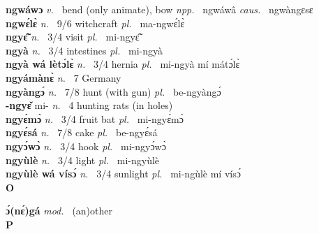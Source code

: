 {\bfseries ngwáwɔ}  {\itshape v.~} bend (only animate), bow   {\itshape npp.~} ngwáwâ {\itshape caus.~} ngwàngɛsɛ   \\ 
{\bfseries ngwɛ́lɛ̀}  {\itshape n.~} 9/6 witchcraft  {\itshape pl.~} ma-ngwɛ́lɛ̀  \\ 
{\bfseries ngyɛ̃̂}  {\itshape n.~} 3/4 visit {\itshape pl.~} mi-ngyɛ̃̂    \\ 
{\bfseries ngyà}  {\itshape n.~} 3/4 intestines {\itshape pl.~} mi-ngyà    \\ 
{\bfseries ngyà wá lètɔ́lɛ̀}  {\itshape n.~} 3/4 hernia {\itshape pl.~} mi-ngyà mí mátɔ́lɛ̀    \\ 
{\bfseries ngyámànɛ̀}  {\itshape n.~} 7 Germany    \\ 
{\bfseries ngyàngɔ́}  {\itshape n.~} 7/8 hunt (with gun) {\itshape pl.~} be-ngyàngɔ́    \\ 
{\bfseries -ngyɛ̌} mi- {\itshape n.~} 4 hunting rats (in holes)    \\ 
{\bfseries ngyɛ́mɔ̀}  {\itshape n.~} 3/4 fruit bat  {\itshape pl.~} mi-ngyɛ́mɔ̀    \\ 
{\bfseries ngyɛ́sá}  {\itshape n.~} 7/8 cake  {\itshape pl.~} be-ngyɛ́sá    \\ 
{\bfseries ngyɔ́wɔ̀}  {\itshape n.~} 3/4 hook {\itshape pl.~} mi-ngyɔ́wɔ̀   \\ 
{\bfseries ngyùlè}  {\itshape n.~} 3/4 light {\itshape pl.~} mi-ngyùlè    \\ 
{\bfseries ngyùlè wá vísɔ́}  {\itshape n.~} 3/4 sunlight {\itshape pl.~} mi-ngùlè mí vísɔ́    \\ 

\medskip
\noindent \large {\bfseries O}\normalsize\\
\medskip

\noindent
{\bfseries ɔ́(nɛ́)gá}  {\itshape mod.~} (an)other    \\ 

\medskip
\noindent \large {\bfseries P}\normalsize\\
\medskip


